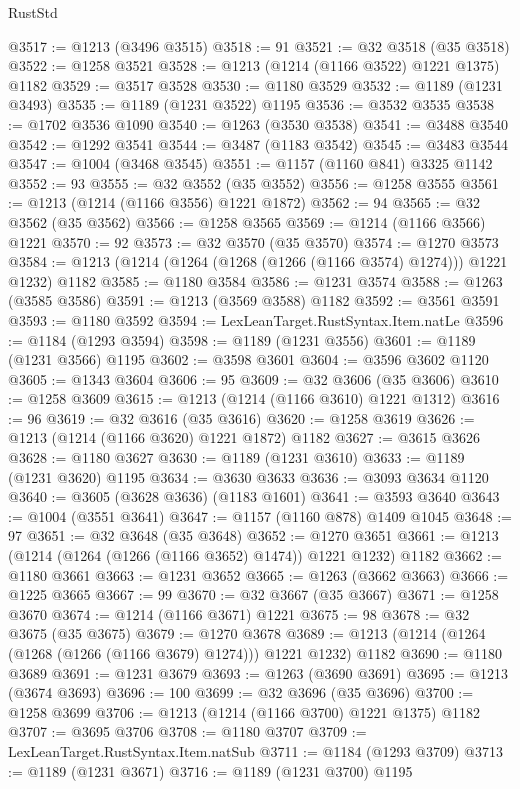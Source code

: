 \begin{lexlean}{RustStd}
\begin{coremodule}
@3517 := @1213 (@3496 @3515)
@3518 := 91
@3521 := @32 @3518 (@35 @3518)
@3522 := @1258 @3521
@3528 := @1213 (@1214 (@1166 @3522) @1221 @1375) @1182
@3529 := @3517 @3528
@3530 := @1180 @3529
@3532 := @1189 (@1231 @3493)
@3535 := @1189 (@1231 @3522) @1195
@3536 := @3532 @3535
@3538 := @1702 @3536 @1090
@3540 := @1263 (@3530 @3538)
@3541 := @3488 @3540
@3542 := @1292 @3541
@3544 := @3487 (@1183 @3542)
@3545 := @3483 @3544
@3547 := @1004 (@3468 @3545)
@3551 := @1157 (@1160 @841) @3325 @1142
@3552 := 93
@3555 := @32 @3552 (@35 @3552)
@3556 := @1258 @3555
@3561 := @1213 (@1214 (@1166 @3556) @1221 @1872)
@3562 := 94
@3565 := @32 @3562 (@35 @3562)
@3566 := @1258 @3565
@3569 := @1214 (@1166 @3566) @1221
@3570 := 92
@3573 := @32 @3570 (@35 @3570)
@3574 := @1270 @3573
@3584 := @1213 (@1214 (@1264 (@1268 (@1266 (@1166 @3574) @1274))) @1221 @1232) @1182
@3585 := @1180 @3584
@3586 := @1231 @3574
@3588 := @1263 (@3585 @3586)
@3591 := @1213 (@3569 @3588) @1182
@3592 := @3561 @3591
@3593 := @1180 @3592
@3594 := LexLeanTarget.RustSyntax.Item.natLe
@3596 := @1184 (@1293 @3594)
@3598 := @1189 (@1231 @3556)
@3601 := @1189 (@1231 @3566) @1195
@3602 := @3598 @3601
@3604 := @3596 @3602 @1120
@3605 := @1343 @3604
@3606 := 95
@3609 := @32 @3606 (@35 @3606)
@3610 := @1258 @3609
@3615 := @1213 (@1214 (@1166 @3610) @1221 @1312)
@3616 := 96
@3619 := @32 @3616 (@35 @3616)
@3620 := @1258 @3619
@3626 := @1213 (@1214 (@1166 @3620) @1221 @1872) @1182
@3627 := @3615 @3626
@3628 := @1180 @3627
@3630 := @1189 (@1231 @3610)
@3633 := @1189 (@1231 @3620) @1195
@3634 := @3630 @3633
@3636 := @3093 @3634 @1120
@3640 := @3605 (@3628 @3636) (@1183 @1601)
@3641 := @3593 @3640
@3643 := @1004 (@3551 @3641)
@3647 := @1157 (@1160 @878) @1409 @1045
@3648 := 97
@3651 := @32 @3648 (@35 @3648)
@3652 := @1270 @3651
@3661 := @1213 (@1214 (@1264 (@1266 (@1166 @3652) @1474)) @1221 @1232) @1182
@3662 := @1180 @3661
@3663 := @1231 @3652
@3665 := @1263 (@3662 @3663)
@3666 := @1225 @3665
@3667 := 99
@3670 := @32 @3667 (@35 @3667)
@3671 := @1258 @3670
@3674 := @1214 (@1166 @3671) @1221
@3675 := 98
@3678 := @32 @3675 (@35 @3675)
@3679 := @1270 @3678
@3689 := @1213 (@1214 (@1264 (@1268 (@1266 (@1166 @3679) @1274))) @1221 @1232) @1182
@3690 := @1180 @3689
@3691 := @1231 @3679
@3693 := @1263 (@3690 @3691)
@3695 := @1213 (@3674 @3693)
@3696 := 100
@3699 := @32 @3696 (@35 @3696)
@3700 := @1258 @3699
@3706 := @1213 (@1214 (@1166 @3700) @1221 @1375) @1182
@3707 := @3695 @3706
@3708 := @1180 @3707
@3709 := LexLeanTarget.RustSyntax.Item.natSub
@3711 := @1184 (@1293 @3709)
@3713 := @1189 (@1231 @3671)
@3716 := @1189 (@1231 @3700) @1195

\end{coremodule}
\end{lexlean}
